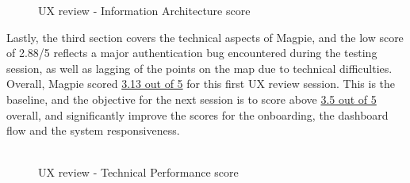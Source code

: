 \begin{figure}
    \centering
    \caption{UX review - Information Architecture score}
\end{figure}
\newpage
Lastly, the third section covers the technical aspects of Magpie, and the low score of 2.88/5 reflects a major authentication bug encountered during the testing session, as well as lagging of the points on the map due to technical difficulties.\\
Overall, Magpie scored \underline{3.13 out of 5} for this first UX review session. This is the baseline, and the objective for the next session is to score above \underline{3.5 out of 5} overall, and significantly improve the scores for the onboarding, the dashboard flow and the system responsiveness.\\\\
\begin{figure}
    \centering
    \caption{UX review - Technical Performance score}
\end{figure}
